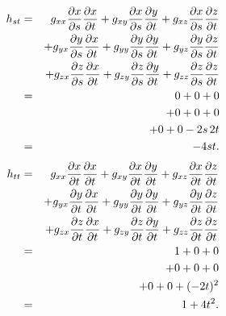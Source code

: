 \documentclass[aps,prl,twocolumn,groupedaddress]{revtex4-2}
\begin{document}
\begin{eqnarray}
h_{st}
&=&
g_{xx}
\frac{\partial x}{\partial s}
\frac{\partial x}{\partial t}
+
g_{xy}
\frac{\partial x}{\partial s}
\frac{\partial y}{\partial t}
+
g_{xz}
\frac{\partial x}{\partial s}
\frac{\partial z}{\partial t}
\notag
\\
&&
+
g_{yx}
\frac{\partial y}{\partial s}
\frac{\partial x}{\partial t}
+
g_{yy}
\frac{\partial y}{\partial s}
\frac{\partial y}{\partial t}
+
g_{yz}
\frac{\partial y}{\partial s}
\frac{\partial z}{\partial t}
\notag
\\
&&
+
g_{zx}
\frac{\partial z}{\partial s}
\frac{\partial x}{\partial t}
+
g_{zy}
\frac{\partial z}{\partial s}
\frac{\partial y}{\partial t}
+
g_{zz}
\frac{\partial z}{\partial s}
\frac{\partial z}{\partial t}
\notag
\\
&=&
0 + 0 + 0 \notag\\
&&
+ 0 + 0 + 0 \notag\\
&&
+ 0 + 0 - 2s \, 2t
\notag
\\
&=&
-4st.
\notag
\end{eqnarray}
\begin{eqnarray}
h_{tt}
&=&
g_{xx}
\frac{\partial x}{\partial t}
\frac{\partial x}{\partial t}
+
g_{xy}
\frac{\partial x}{\partial t}
\frac{\partial y}{\partial t}
+
g_{xz}
\frac{\partial x}{\partial t}
\frac{\partial z}{\partial t}
\notag
\\
&&
+
g_{yx}
\frac{\partial y}{\partial t}
\frac{\partial x}{\partial t}
+
g_{yy}
\frac{\partial y}{\partial t}
\frac{\partial y}{\partial t}
+
g_{yz}
\frac{\partial y}{\partial t}
\frac{\partial z}{\partial t}
\notag
\\
&&
+
g_{zx}
\frac{\partial z}{\partial t}
\frac{\partial x}{\partial t}
+
g_{zy}
\frac{\partial z}{\partial t}
\frac{\partial y}{\partial t}
+
g_{zz}
\frac{\partial z}{\partial t}
\frac{\partial z}{\partial t}
\notag
\\
&=&
1 + 0 + 0 \notag\\
&&
+ 0 + 0 + 0 \notag\\
&&
+ 0 + 0 + (-2t)^2
\notag
\\
&=&
1 + 4t^2.
\notag
\end{eqnarray}



%
\end{document}
